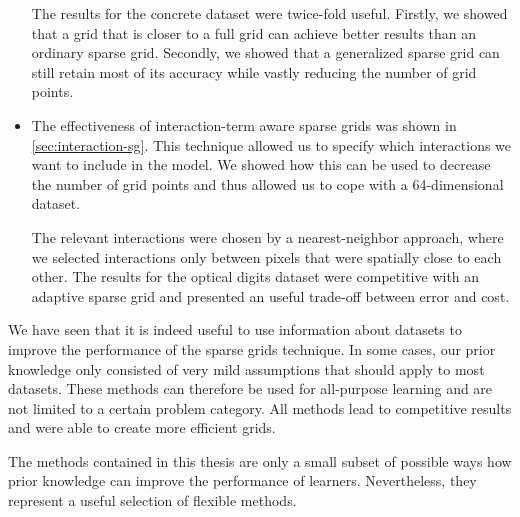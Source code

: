 \begin{itemize}
  The results for the concrete dataset were twice-fold useful.
  Firstly, we showed that a grid that is closer to a full grid can achieve better results than an ordinary sparse grid.
  Secondly, we showed that a generalized sparse grid can still retain most of its accuracy while vastly reducing the number of grid points.
\item The effectiveness of interaction-term aware sparse grids was shown in \cref{sec:interaction-sg}.
  This technique allowed us to specify which interactions we want to include in
  the model.
  We showed how this can be used to decrease the number of grid points and thus
  allowed us to cope with a 64-dimensional dataset.

  The relevant interactions were chosen by a nearest-neighbor approach, where we selected interactions only between pixels that were spatially close to
  each other.
  The results for the optical digits dataset were competitive with an adaptive
  sparse grid and presented an useful trade-off between error and cost.
\end{itemize}

We have seen that it is indeed useful to use information about datasets to improve the performance of the sparse grids technique.
In some cases, our prior knowledge only consisted of very mild assumptions that should apply to most datasets.
These methods can therefore be used for all-purpose learning and are not limited to a certain problem category.
All methods lead to competitive results and were able to create more efficient grids.

The methods contained in this thesis are only a small subset of possible ways
how prior knowledge can improve the performance of learners.
Nevertheless, they represent a useful selection of flexible methods.



